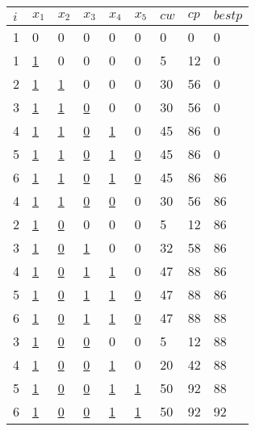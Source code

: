 \documentclass{article}
\begin{document}
\begin{CJK*}{UTF8}{gbsn}
\begin{center}
\begin{tabular}{|l|l|l|l|l|l|l|l|l|}
\hline
$i$	&$x_1$			&$x_2$			&$x_3$			&$x_4$			&$x_5$			&$cw$		&$cp$		&$bestp$\\ \hline
1	&0				&0				&0				&0				&0				&0			&0			&0		\\ \hline
1	&\underline{1}	&0				&0				&0				&0				&5			&12			&0		\\ \hline
2	&\underline{1}	&\underline{1}	&0				&0				&0				&30			&56			&0		\\ \hline
3	&\underline{1}	&\underline{1}	&\underline{0}	&0				&0				&30			&56			&0		\\ \hline
4	&\underline{1}	&\underline{1}	&\underline{0}	&\underline{1}	&0				&45			&86			&0		\\ \hline
5	&\underline{1}	&\underline{1}	&\underline{0}	&\underline{1}	&\underline{0}	&45			&86			&0		\\ \hline
6	&\underline{1}	&\underline{1}	&\underline{0}	&\underline{1}	&\underline{0}	&45			&86			&86		\\ \hline
4	&\underline{1}	&\underline{1}	&\underline{0}	&\underline{0}	&0				&30			&56			&86		\\ \hline
2	&\underline{1}	&\underline{0}	&0				&0				&0				&5			&12			&86		\\ \hline
3	&\underline{1}	&\underline{0}	&\underline{1}	&0				&0				&32			&58			&86		\\ \hline
4	&\underline{1}	&\underline{0}	&\underline{1}	&\underline{1}	&0				&47			&88			&86		\\ \hline
5	&\underline{1}	&\underline{0}	&\underline{1}	&\underline{1}	&\underline{0}	&47			&88			&86		\\ \hline
6	&\underline{1}	&\underline{0}	&\underline{1}	&\underline{1}	&\underline{0}	&47			&88			&88		\\ \hline
3	&\underline{1}	&\underline{0}	&\underline{0}	&0				&0				&5			&12			&88		\\ \hline
4	&\underline{1}	&\underline{0}	&\underline{0}	&\underline{1}	&0				&20			&42			&88		\\ \hline
5	&\underline{1}	&\underline{0}	&\underline{0}	&\underline{1}	&\underline{1}	&50			&92			&88		\\ \hline
6	&\underline{1}	&\underline{0}	&\underline{0}	&\underline{1}	&\underline{1}	&50			&92			&92		\\ \hline
\end{tabular}
\end{center}


\end{CJK*}
\end{document}
